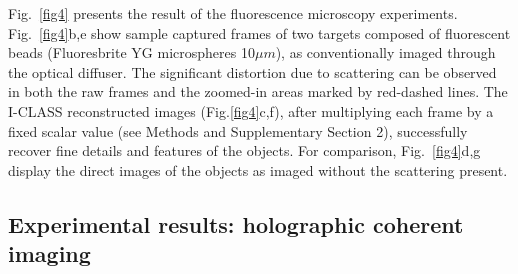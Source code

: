 \documentclass[pdflatex,sn-mathphys-num]{sn-jnl}%
\theoremstyle{thmstyleone}%
\theoremstyle{thmstyletwo}%
\theoremstyle{thmstylethree}%
\begin{document}
Fig.~\ref{fig4} presents the result of the fluorescence microscopy experiments. Fig.~\ref{fig4}b,e show sample captured frames of two targets composed of fluorescent beads (Fluoresbrite YG microspheres 10$\mu m$), as conventionally imaged through the optical diffuser. The significant distortion due to scattering can be observed in both the raw frames and the zoomed-in areas marked by red-dashed lines. The I-CLASS reconstructed images (Fig.\ref{fig4}c,f), after multiplying each frame by a fixed scalar value (see Methods and Supplementary Section 2), successfully recover fine details and features of the objects. For comparison, Fig.~\ref{fig4}d,g display the direct images of the objects as imaged without the scattering present.





\pagebreak

\subsection*{Experimental results: holographic coherent imaging}
\end{document}
